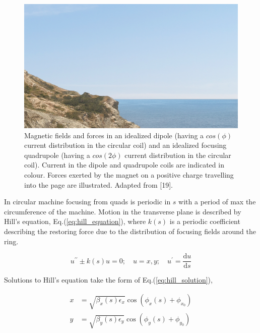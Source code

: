 \begin{figure}[!htb]
    \begin{center}
    \includegraphics[width = 0.9\linewidth]{Figures/placeholder.png}
    \caption{Magnetic fields and forces in an idealized dipole (having a $cos(\phi)$ current distribution in the circular coil) and an idealized focusing quadrupole (having a $cos(2\phi)$ current distribution in the circular coil). Current in the dipole and quadrupole coils are indicated in colour. Forces exerted by the magnet on a positive charge travelling into the page are illustrated. Adapted from [19].}
    \label{fig:dipole_quadrupole_fields}
    \end{center}
\end{figure}

In circular machine focusing from quads is periodic in $s$ with a period of max the circumference of the machine.
Motion in the transverse plane is described by Hill’s equation, Eq.(\ref{eq:hill_equation}), where $k(s)$ is a periodic coefficient describing the restoring force due to the distribution of focusing fields around the ring.
\bigbreak

\begin{equation}
    u^{\prime \prime} \pm k(s) u = 0; \quad u = x, y; \quad u^{\prime} = \frac{\mathrm{d}u}{\mathrm{d}s}
    \label{eq:hill_equation}
\end{equation}
\bigbreak

Solutions to Hill’s equation take the form of Eq.(\ref{eq:hill_solution}),
\bigbreak

\begin{equation}
    \begin{aligned}
    x &= \sqrt{\beta_{x}(s) \epsilon_{x}} \cos \left(\phi_{x}(s) + \phi_{x_0}\right) \\
    y &= \sqrt{\beta_{y}(s) \epsilon_{y}} \cos \left(\phi_{y}(s) + \phi_{y_0}\right)
    \end{aligned}
    \label{eq:hill_solution}
\end{equation}

